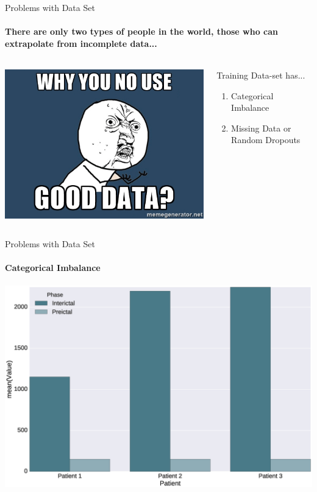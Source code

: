 \documentclass{beamer}
\begin{document}
\begin{frame}{Problems with Data Set}
  \framesubtitle{There are only two types of people in the world, those who can
    extrapolate from incomplete data...}

  \begin{columns}
    
      \includegraphics[scale=0.43]{img/baddata.jpg}



    \begin{block}{Training Data-set has...}
      \begin{enumerate}
      \item Categorical Imbalance
      \item Missing Data or Random Dropouts
      \end{enumerate}
    \end{block}

  \end{columns}
  
\end{frame}

\begin{frame}{Problems with Data Set}
  \framesubtitle{Categorical Imbalance}

  \begin{center}
    \includegraphics[scale=0.28]{img/cat_imbalance.eps}
  \end{center}
\end{frame}
\end{document}

